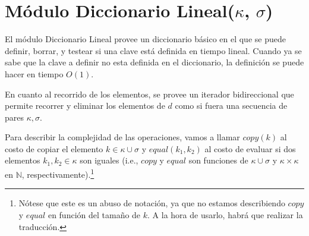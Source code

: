 \documentclass[a4paper,10pt]{article}
\begin{document}
\section{Módulo Diccionario Lineal($\kappa$, $\sigma$)}

El módulo Diccionario Lineal provee un diccionario básico en el que se puede definir, borrar, y testear si una clave está definida en tiempo lineal.  Cuando ya se sabe que la clave a definir no esta definida en el diccionario, la definición se puede hacer en tiempo $O(1)$.

En cuanto al recorrido de los elementos, se provee un iterador bidireccional que permite recorrer y eliminar los elementos de $d$ como si fuera una secuencia de pares $\kappa,\sigma$.

Para describir la complejidad de las operaciones, vamos a llamar $copy(k)$ al costo de copiar el elemento $k \in \kappa \cup \sigma$ y $equal(k_1, k_2)$ al costo de evaluar si dos elementos $k_1, k_2 \in \kappa$ son iguales (i.e., $copy$ y $equal$ son funciones de $\kappa \cup \sigma$ y $\kappa \times \kappa$ en $\mathbb{N}$, respectivamente).\footnote{Nótese que este es un abuso de notación, ya que no estamos describiendo $copy$ y $equal$ en función del tamaño de $k$.  A la hora de usarlo, habrá que realizar la traducción.}
\end{document}
